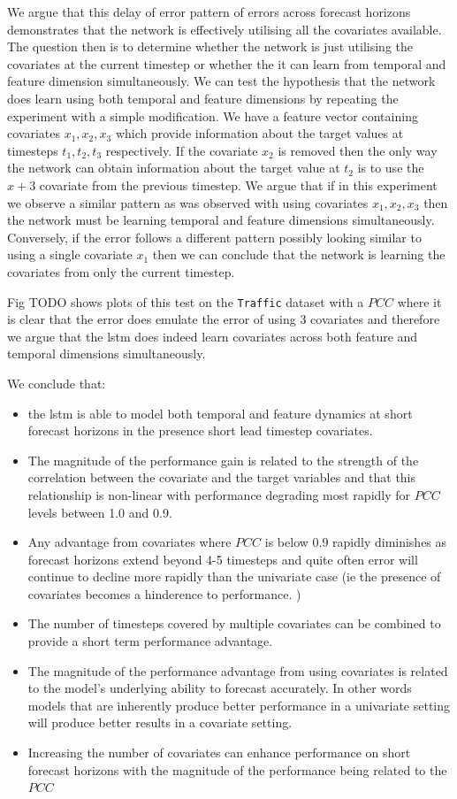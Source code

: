 \documentclass{article}
\newcommand{\pearson}{PCC}
\begin{document}
We argue that this delay of error pattern of errors across forecast horizons demonstrates 
that the network is effectively utilising all the covariates available. The question then is to determine whether the network is just utilising the covariates at the current timestep 
or whether the it can learn from temporal and feature dimension simultaneously. We can test the hypothesis that the network does learn using both temporal 
and feature dimensions by repeating the experiment with a simple modification. We have a feature vector containing covariates $x_1, x_2, x_3$ which provide information 
about the target values at timesteps $t_1, t_2, t_3$ respectively. If the covariate $x_2$ is removed then the only way the network can obtain information about the 
target value at $t_2$ is to use the $x+3$ covariate from the previous timestep. We argue that if in this experiment we observe a similar pattern as was observed with 
using covariates $x_1, x_2, x_3$ then the network must be learning temporal and feature dimensions simultaneously. Conversely, if the error follows a different pattern
possibly looking similar to using a single covariate $x_1$ then we can conclude that the network is learning the covariates from only the current timestep. 

Fig TODO shows plots of this test on the \texttt{Traffic} dataset with a $\pearson$ where it is clear that the error does emulate the error of using 
3 covariates and therefore we argue that the lstm does indeed learn covariates across both feature and temporal dimensions simultaneously.



We conclude that:
\begin{itemize}
\item the lstm is able to model both temporal and feature dynamics at short forecast horizons in the presence short lead timestep covariates.
\item The magnitude of the performance gain is related to the strength of the correlation between the covariate and the target variables and that this relationship 
is non-linear with performance degrading most rapidly for $\pearson$ levels between 1.0 and 0.9. 
\item Any advantage from covariates where $\pearson$ is below 0.9 rapidly diminishes as forecast horizons extend beyond 4-5 timesteps and quite often error will continue to decline more rapidly than 
the univariate case (ie the presence of covariates becomes a hinderence to performance. )
\item The number of timesteps covered by multiple covariates can be combined to provide a short term performance advantage. 
\item The magnitude of the performance advantage from using covariates is related to the model's underlying ability to forecast accurately. In other words models that are 
inherently produce better performance in a univariate setting will produce better results in a covariate setting. 
\item Increasing the number of covariates can enhance performance on short forecast horizons with the magnitude of the performance being related to the $\pearson$
\end{itemize}
\end{document}

